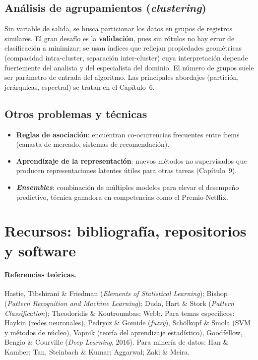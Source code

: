 \subsection{Análisis de agrupamientos (\emph{clustering})}

Sin variable de salida, se busca particionar los datos en grupos de
registros similares. El gran desafío es la \textbf{validación}, pues sin
rótulos no hay error de clasificación a minimizar; se usan índices que
reflejan propiedades geométricas (compacidad intra-cluster, separación
inter-cluster) cuya interpretación depende fuertemente del analista y
del especialista del dominio. El número de grupos suele ser parámetro de
entrada del algoritmo. Las principales abordajes (partición,
jerárquicas, espectral) se tratan en el Capítulo~6.

\subsection{Otros problemas y técnicas}

\begin{itemize}[leftmargin=1.2cm]
  \item \textbf{Reglas de asociación}: encuentran co-ocurrencias
        frecuentes entre ítems (canasta de mercado, sistemas de
        recomendación).
  \item \textbf{Aprendizaje de la representación}: nuevos métodos no
        supervisados que producen representaciones latentes útiles para
        otras tareas (Capítulo~9).
  \item \textbf{\emph{Ensembles}}: combinación de múltiples modelos para
        elevar el desempeño predictivo, técnica ganadora en competencias
        como el Premio Netflix.
\end{itemize}

\section{Recursos: bibliografía, repositorios y software}

\paragraph{Referencias teóricas.} Hastie, Tibshirani \& Friedman
(\emph{Elements of Statistical Learning}); Bishop (\emph{Pattern
Recognition and Machine Learning}); Duda, Hart \& Stork (\emph{Pattern
Classification}); Theodoridis \& Koutroumbas; Webb. Para temas
específicos: Haykin (redes neuronales), Pedrycz \& Gomide (\emph{fuzzy}),
Schölkopf \& Smola (SVM y métodos de núcleo), Vapnik (teoría del
aprendizaje estadístico), Goodfellow, Bengio \& Courville (\emph{Deep
Learning}, 2016). Para minería de datos: Han \& Kamber; Tan, Steinbach \&
Kumar; Aggarwal; Zaki \& Meira.

